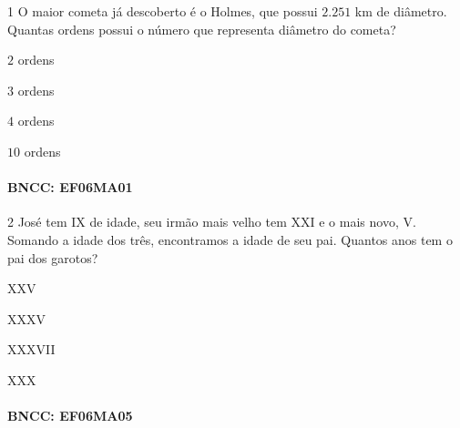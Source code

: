 {

\num{1}  O maior cometa já descoberto é o Holmes, que possui $2.251$ km de
diâmetro. Quantas ordens possui o número que representa diâmetro do cometa?

\begin{escolha}
\item $2$ ordens
\item $3$ ordens
\item $4$ ordens
\item $10$ ordens
\end{escolha}

\paragraph{BNCC: EF06MA01}




\num{2}  José tem IX de idade, seu irmão mais velho tem XXI e o mais novo, V.
Somando a idade dos três, encontramos a idade de seu pai. Quantos anos
tem o pai dos garotos?

\begin{escolha}
\item XXV
\item XXXV
\item XXXVII
\item XXX
\end{escolha}

\paragraph{BNCC: EF06MA05}


}
